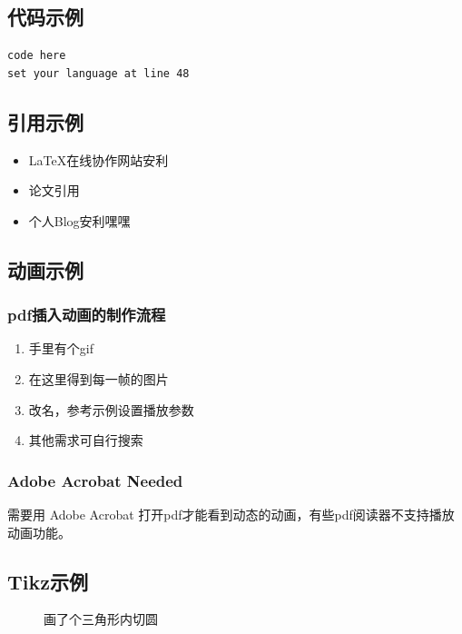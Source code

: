 \documentclass{article}
\begin{document}
\subsection{代码示例}
\begin{lstlisting}
code here
set your language at line 48

\end{lstlisting}

\subsection{引用示例}
\begin{itemize}
 \item  LaTeX在线协作网站安利\cite{overleaf}
 \item  论文引用\cite{six-directional}
 \item  个人Blog安利嘿嘿\cite{myblog}

\end{itemize}

\subsection{动画示例}
\subsubsection{pdf插入动画的制作流程}

\begin{enumerate}
\item 手里有个gif
\item 在这里\cite{iloveimg}得到每一帧的图片
\item 改名，参考示例设置播放参数
\item 其他需求可自行搜索
\end{enumerate}

\subsubsection{Adobe Acrobat Needed}
需要用 Adobe Acrobat 打开pdf才能看到动态的动画，有些pdf阅读器不支持播放动画功能。
\begin{figure}[H]
\centering
{}

\end{figure}


\subsection{Tikz示例}
\begin{figure}[H]
\centering
{}
\caption{画了个三角形内切圆}
\end{figure}
\end{document}
